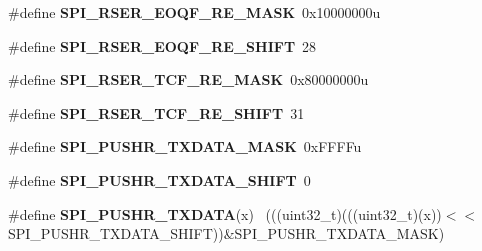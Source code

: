 \begin{DoxyCompactItemize}
\item 
\hypertarget{group___s_p_i___register___masks_ga41b148811704b6e9903262dbd1d72433}{}\#define {\bfseries S\+P\+I\+\_\+\+R\+S\+E\+R\+\_\+\+E\+O\+Q\+F\+\_\+\+R\+E\+\_\+\+M\+A\+S\+K}~0x10000000u\label{group___s_p_i___register___masks_ga41b148811704b6e9903262dbd1d72433}

\item 
\hypertarget{group___s_p_i___register___masks_ga93b9a7fbf5962c0e407879c781779ac4}{}\#define {\bfseries S\+P\+I\+\_\+\+R\+S\+E\+R\+\_\+\+E\+O\+Q\+F\+\_\+\+R\+E\+\_\+\+S\+H\+I\+F\+T}~28\label{group___s_p_i___register___masks_ga93b9a7fbf5962c0e407879c781779ac4}

\item 
\hypertarget{group___s_p_i___register___masks_ga51ba97f1d47ebd36d19c5a634ce96873}{}\#define {\bfseries S\+P\+I\+\_\+\+R\+S\+E\+R\+\_\+\+T\+C\+F\+\_\+\+R\+E\+\_\+\+M\+A\+S\+K}~0x80000000u\label{group___s_p_i___register___masks_ga51ba97f1d47ebd36d19c5a634ce96873}

\item 
\hypertarget{group___s_p_i___register___masks_ga51740ce9a6d3a38cf50cb1f19af3d002}{}\#define {\bfseries S\+P\+I\+\_\+\+R\+S\+E\+R\+\_\+\+T\+C\+F\+\_\+\+R\+E\+\_\+\+S\+H\+I\+F\+T}~31\label{group___s_p_i___register___masks_ga51740ce9a6d3a38cf50cb1f19af3d002}

\item 
\hypertarget{group___s_p_i___register___masks_gac3651a6adad71c41138f88336e7711b4}{}\#define {\bfseries S\+P\+I\+\_\+\+P\+U\+S\+H\+R\+\_\+\+T\+X\+D\+A\+T\+A\+\_\+\+M\+A\+S\+K}~0x\+F\+F\+F\+Fu\label{group___s_p_i___register___masks_gac3651a6adad71c41138f88336e7711b4}

\item 
\hypertarget{group___s_p_i___register___masks_gac9778e35b8039b1268b42e16066a7812}{}\#define {\bfseries S\+P\+I\+\_\+\+P\+U\+S\+H\+R\+\_\+\+T\+X\+D\+A\+T\+A\+\_\+\+S\+H\+I\+F\+T}~0\label{group___s_p_i___register___masks_gac9778e35b8039b1268b42e16066a7812}

\item 
\hypertarget{group___s_p_i___register___masks_ga23aa2da43f4aec186aac35f443cce852}{}\#define {\bfseries S\+P\+I\+\_\+\+P\+U\+S\+H\+R\+\_\+\+T\+X\+D\+A\+T\+A}(x)                                        ~(((uint32\+\_\+t)(((uint32\+\_\+t)(x))$<$$<$S\+P\+I\+\_\+\+P\+U\+S\+H\+R\+\_\+\+T\+X\+D\+A\+T\+A\+\_\+\+S\+H\+I\+F\+T))\&S\+P\+I\+\_\+\+P\+U\+S\+H\+R\+\_\+\+T\+X\+D\+A\+T\+A\+\_\+\+M\+A\+S\+K)\label{group___s_p_i___register___masks_ga23aa2da43f4aec186aac35f443cce852}


\end{DoxyCompactItemize}

